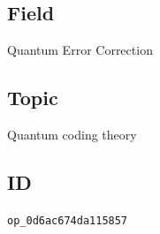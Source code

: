 \subsection*{Field}

Quantum Error Correction

\subsection*{Topic}

Quantum coding theory

\subsection*{ID}

\texttt{op\_0d6ac674da115857}
